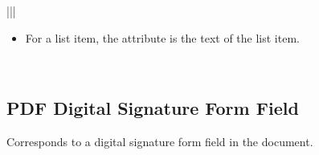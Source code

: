 \documentclass[letterpaper,12pt,english,openany,oneside]{sphinxmanual}
\begin{document}
\begin{savenotes}
\begin{tabular}[t]{|*{2}{|}}
\begin{itemize}
\item {} 
For a list item, the  attribute is the text of the list item.

\end{itemize}
\\
\hline
\end{tabular}
\par
\sphinxattableend\end{savenotes}




\subsection{PDF Digital Signature Form Field}
\label{\detokenize{MSAA_PDF:pdf-digital-signature-form-field}}
Corresponds to a digital signature form field in the document.
\end{document}
